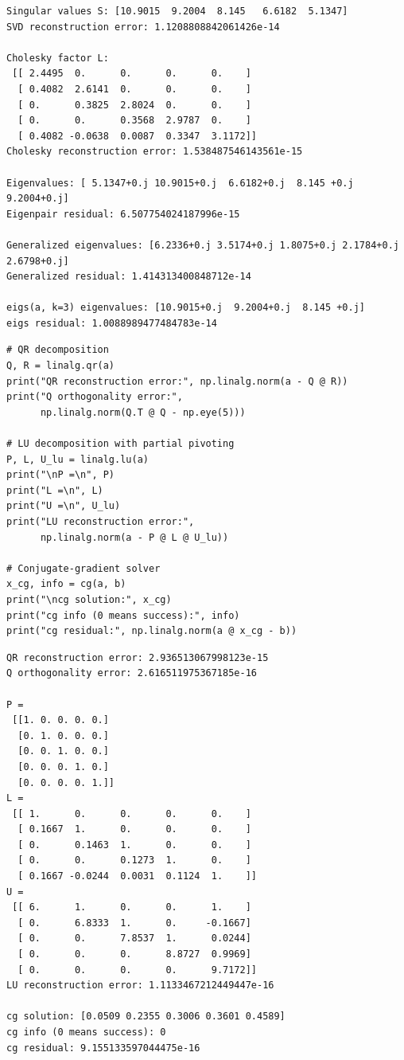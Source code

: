 \documentclass[11pt]{article}
\begin{document}
\begin{lstlisting}[style=terminal]
Singular values S: [10.9015  9.2004  8.145   6.6182  5.1347]
SVD reconstruction error: 1.1208808842061426e-14

Cholesky factor L:
 [[ 2.4495  0.      0.      0.      0.    ]
  [ 0.4082  2.6141  0.      0.      0.    ]
  [ 0.      0.3825  2.8024  0.      0.    ]
  [ 0.      0.      0.3568  2.9787  0.    ]
  [ 0.4082 -0.0638  0.0087  0.3347  3.1172]]
Cholesky reconstruction error: 1.538487546143561e-15

Eigenvalues: [ 5.1347+0.j 10.9015+0.j  6.6182+0.j  8.145 +0.j  9.2004+0.j]
Eigenpair residual: 6.507754024187996e-15

Generalized eigenvalues: [6.2336+0.j 3.5174+0.j 1.8075+0.j 2.1784+0.j 2.6798+0.j]
Generalized residual: 1.414313400848712e-14

eigs(a, k=3) eigenvalues: [10.9015+0.j  9.2004+0.j  8.145 +0.j]
eigs residual: 1.0088989477484783e-14
\end{lstlisting}

\begin{lstlisting}[style=python]
# QR decomposition
Q, R = linalg.qr(a)
print("QR reconstruction error:", np.linalg.norm(a - Q @ R))
print("Q orthogonality error:",
      np.linalg.norm(Q.T @ Q - np.eye(5)))

# LU decomposition with partial pivoting
P, L, U_lu = linalg.lu(a)
print("\nP =\n", P)
print("L =\n", L)
print("U =\n", U_lu)
print("LU reconstruction error:",
      np.linalg.norm(a - P @ L @ U_lu))

# Conjugate-gradient solver
x_cg, info = cg(a, b)
print("\ncg solution:", x_cg)
print("cg info (0 means success):", info)
print("cg residual:", np.linalg.norm(a @ x_cg - b))
\end{lstlisting}

\begin{lstlisting}[style=terminal]
QR reconstruction error: 2.936513067998123e-15
Q orthogonality error: 2.616511975367185e-16

P =
 [[1. 0. 0. 0. 0.]
  [0. 1. 0. 0. 0.]
  [0. 0. 1. 0. 0.]
  [0. 0. 0. 1. 0.]
  [0. 0. 0. 0. 1.]]
L =
 [[ 1.      0.      0.      0.      0.    ]
  [ 0.1667  1.      0.      0.      0.    ]
  [ 0.      0.1463  1.      0.      0.    ]
  [ 0.      0.      0.1273  1.      0.    ]
  [ 0.1667 -0.0244  0.0031  0.1124  1.    ]]
U =
 [[ 6.      1.      0.      0.      1.    ]
  [ 0.      6.8333  1.      0.     -0.1667]
  [ 0.      0.      7.8537  1.      0.0244]
  [ 0.      0.      0.      8.8727  0.9969]
  [ 0.      0.      0.      0.      9.7172]]
LU reconstruction error: 1.1133467212449447e-16

cg solution: [0.0509 0.2355 0.3006 0.3601 0.4589]
cg info (0 means success): 0
cg residual: 9.155133597044475e-16
\end{lstlisting}
\end{document}
